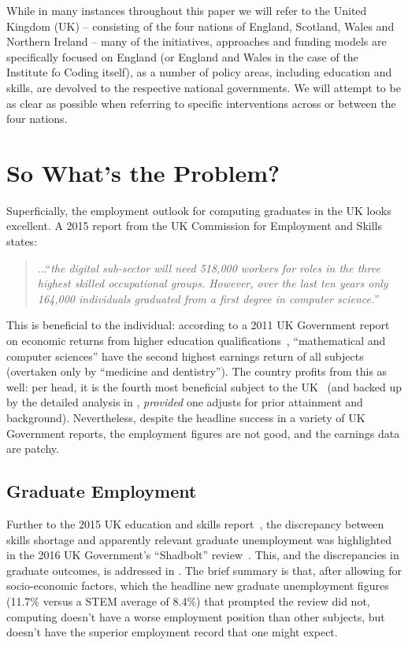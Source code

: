\documentclass[conference]{IEEEtran}
\begin{document}
While in many instances throughout this paper we will refer to the
United Kingdom (UK) -- consisting of the four nations of England,
Scotland, Wales and Northern Ireland -- many of the initiatives,
approaches and funding models are specifically focused on England (or
England and Wales in the case of the Institute fo Coding itself), as a number of policy areas, including education
and skills, are devolved to the respective national governments. We will
attempt to be as clear as possible when referring to specific
interventions across or between the four nations.

\section{So What's the Problem?}\label{problem}

Superficially, the employment outlook for computing graduates in the
UK looks excellent. A 2015 report from the UK Commission for
Employment and Skills~\cite[p.~74]{UKCES2015b} states:

\begin{quote} ...``{\emph{the digital sub-sector will need 518,000 workers for
roles in the three highest skilled occupational groups. However, over
the last ten years only 164,000 individuals graduated from a first
degree in computer science.}}''
\end{quote} 

This is beneficial to the individual: according to a 2011 UK
Government report on economic returns from higher education
qualifications~\cite[Figure 4]{BIS2011a}, ``mathematical and
computer sciences'' have the second highest earnings return of all
subjects (overtaken only by ``medicine and dentistry'').  The country
profits from this as well: per head, it is the fourth most beneficial
subject to the UK~\cite[p.~16]{BIS2011a} (and backed up by the detailed analysis in \cite[Figure 15]{DfE2018d}, \emph{provided} one adjusts for prior attainment and background). Nevertheless, despite the
headline success in a variety of UK Government reports, the employment
figures are not good, and the earnings data are patchy.

\subsection{Graduate Employment}

Further to the 2015 UK education and skills report~\cite{UKCES2015b},
the discrepancy between skills shortage and apparently relevant graduate unemployment was highlighted in the 2016 UK Government's ``Shadbolt''
review~\cite{Shadbolt2016a}. This, and the discrepancies in graduate outcomes, is addressed in \cite[\S IIA]{davenport-et-al:cep2019}. The brief summary is that, after allowing for socio-economic factors, which the headline new graduate unemployment figures (11.7\% versus a STEM average of 8.4\%) that prompted the review did not, computing doesn't have a worse employment position than other subjects, but doesn't have the superior employment record that one might expect.
\end{document}
